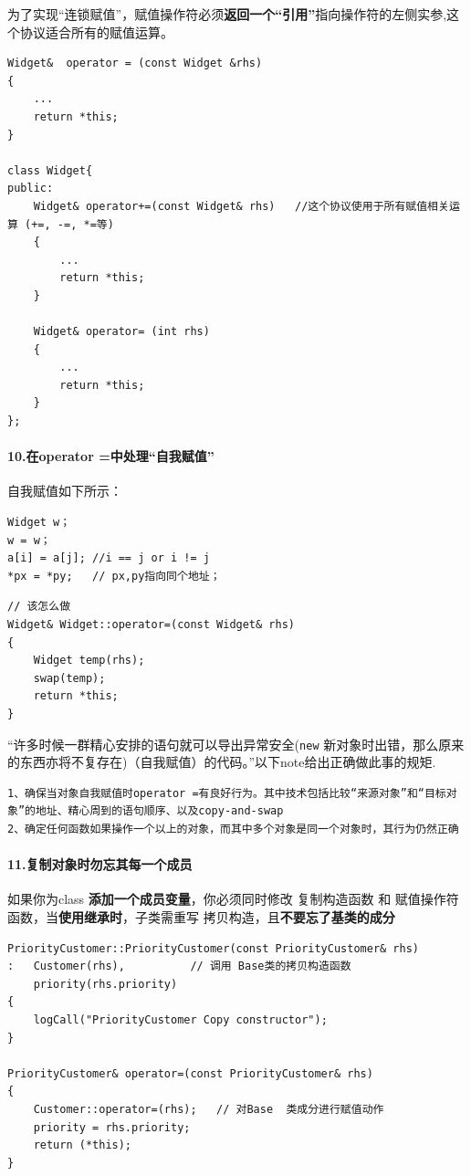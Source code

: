 \documentclass[UTF8,a4paper,12pt]{ctexbook}
\begin{document}
			为了实现“连锁赋值”，赋值操作符必须\textbf{返回一个“引用”}指向操作符的左侧实参,这个协议适合所有的赋值运算。
			\begin{lstlisting}[xleftmargin=.04\textwidth]
Widget&  operator = (const Widget &rhs)
{
	...
	return *this;
}

class Widget{
public:
	Widget& operator+=(const Widget& rhs)   //这个协议使用于所有赋值相关运算 (+=, -=, *=等)
	{
		...
		return *this;
	}
	
	Widget& operator= (int rhs)
	{
		...
		return *this;
	}
};
			\end{lstlisting}
		\paragraph{10.在operator =中处理“自我赋值”}
			自我赋值如下所示：
		\begin{lstlisting}
Widget w；
w = w；
a[i] = a[j]; //i == j or i != j
*px = *py;	 // px,py指向同个地址；
		\end{lstlisting}
		
		\begin{lstlisting}
// 该怎么做
Widget& Widget::operator=(const Widget& rhs)
{ 
	Widget temp(rhs);
	swap(temp);
	return *this;
} 
		\end{lstlisting}
		
		“许多时候一群精心安排的语句就可以导出异常安全(\verb|new| 新对象时出错，那么原来的东西亦将不复存在)（自我赋值）的代码。”以下note给出正确做此事的规矩.
		\begin{lstlisting}[frame = lbrT]
1、确保当对象自我赋值时operator =有良好行为。其中技术包括比较“来源对象”和“目标对象”的地址、精心周到的语句顺序、以及copy-and-swap
2、确定任何函数如果操作一个以上的对象，而其中多个对象是同一个对象时，其行为仍然正确
		\end{lstlisting}	
				
		\paragraph{11.复制对象时勿忘其每一个成员} 如果你为class \textbf{添加一个成员变量}，你必须同时修改 复制构造函数 和 赋值操作符函数，当\textbf{使用继承时}，子类需重写 拷贝构造，且\textbf{不要忘了基类的成分}
		
			\begin{lstlisting}
PriorityCustomer::PriorityCustomer(const PriorityCustomer& rhs)
: 	Customer(rhs), 			// 调用 Base类的拷贝构造函数
	priority(rhs.priority)
{
	logCall("PriorityCustomer Copy constructor");
}

PriorityCustomer& operator=(const PriorityCustomer& rhs)
{
	Customer::operator=(rhs);  	// 对Base  类成分进行赋值动作
	priority = rhs.priority;
	return (*this);
}
			\end{lstlisting}
		
\end{document}
